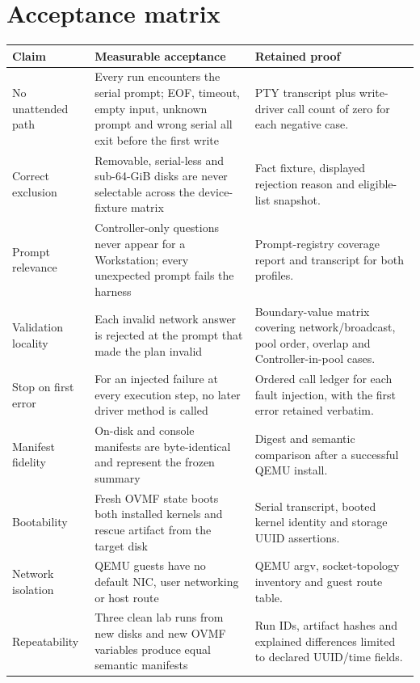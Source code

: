 \section{Acceptance matrix}
\begin{tabularx}{\linewidth}{@{}p{.20\linewidth}p{.33\linewidth}L@{}}
\toprule
\textbf{Claim} & \textbf{Measurable acceptance} & \textbf{Retained proof}\\
\midrule
No unattended path & Every run encounters the serial prompt; EOF, timeout, empty input, unknown prompt and wrong serial all exit before the first write & PTY transcript plus write-driver call count of zero for each negative case.\\
Correct exclusion & Removable, serial-less and sub-64-GiB disks are never selectable across the device-fixture matrix & Fact fixture, displayed rejection reason and eligible-list snapshot.\\
Prompt relevance & Controller-only questions never appear for a Workstation; every unexpected prompt fails the harness & Prompt-registry coverage report and transcript for both profiles.\\
Validation locality & Each invalid network answer is rejected at the prompt that made the plan invalid & Boundary-value matrix covering network/broadcast, pool order, overlap and Controller-in-pool cases.\\
Stop on first error & For an injected failure at every execution step, no later driver method is called & Ordered call ledger for each fault injection, with the first error retained verbatim.\\
Manifest fidelity & On-disk and console manifests are byte-identical and represent the frozen summary & Digest and semantic comparison after a successful QEMU install.\\
Bootability & Fresh OVMF state boots both installed kernels and rescue artifact from the target disk & Serial transcript, booted kernel identity and storage UUID assertions.\\
Network isolation & QEMU guests have no default NIC, user networking or host route & QEMU argv, socket-topology inventory and guest route table.\\
Repeatability & Three clean lab runs from new disks and new OVMF variables produce equal semantic manifests & Run IDs, artifact hashes and explained differences limited to declared UUID/time fields.\\
\bottomrule
\end{tabularx}

